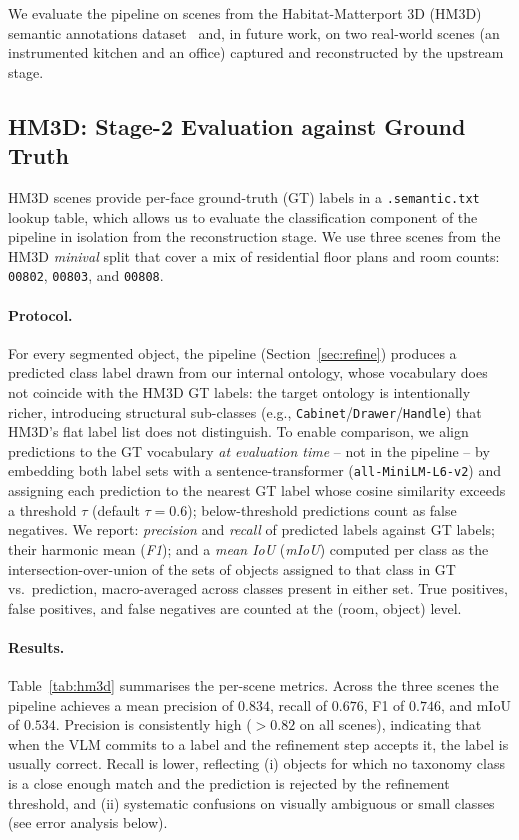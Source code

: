 \documentclass[conference]{IEEEtran}
\begin{document}
We evaluate the pipeline on scenes from the Habitat-Matterport 3D
(HM3D) semantic annotations dataset~\cite{hm3d} and, in future work,
on two real-world scenes (an instrumented kitchen and an office)
captured and reconstructed by the upstream stage.

\subsection{HM3D: Stage-2 Evaluation against Ground Truth}
\label{sec:eval_hm3d}

HM3D scenes provide per-face ground-truth (GT) labels in a
\texttt{.semantic.txt} lookup table, which allows us to evaluate the
classification component of the pipeline in isolation from the
reconstruction stage. We use three scenes from the HM3D \emph{minival}
split that cover a mix of residential floor plans and room counts:
\texttt{00802}, \texttt{00803}, and \texttt{00808}.

\paragraph{Protocol.}
For every segmented object, the pipeline (Section~\ref{sec:refine})
produces a predicted class label drawn from our internal ontology,
whose vocabulary does not coincide with the HM3D GT labels: the target
ontology is intentionally richer, introducing structural sub-classes
(e.g., \texttt{Cabinet}/\texttt{Drawer}/\texttt{Handle}) that HM3D's
flat label list does not distinguish. To enable comparison, we align
predictions to the GT vocabulary \emph{at evaluation time} -- not in
the pipeline -- by embedding both label sets with a sentence-transformer
(\texttt{all-MiniLM-L6-v2}) and assigning each prediction to the
nearest GT label whose cosine similarity exceeds a threshold $\tau$
(default $\tau{=}0.6$); below-threshold predictions count as false
negatives. We report: \emph{precision} and \emph{recall} of predicted
labels against GT labels; their harmonic mean (\emph{F1}); and a
\emph{mean IoU} (\emph{mIoU}) computed per class as the
intersection-over-union of the sets of objects assigned to that class
in GT vs.\ prediction, macro-averaged across classes present in either
set. True positives, false positives, and false negatives are counted
at the (room, object) level.

\paragraph{Results.}
Table~\ref{tab:hm3d} summarises the per-scene metrics. Across the three
scenes the pipeline achieves a mean precision of $0.834$, recall of
$0.676$, F1 of $0.746$, and mIoU of $0.534$. Precision is consistently
high ($>\!0.82$ on all scenes), indicating that when the VLM commits to
a label and the refinement step accepts it, the label is usually
correct. Recall is lower, reflecting (i) objects for which no taxonomy
class is a close enough match and the prediction is rejected by the
refinement threshold, and (ii) systematic confusions on visually
ambiguous or small classes (see error analysis below).
\end{document}
